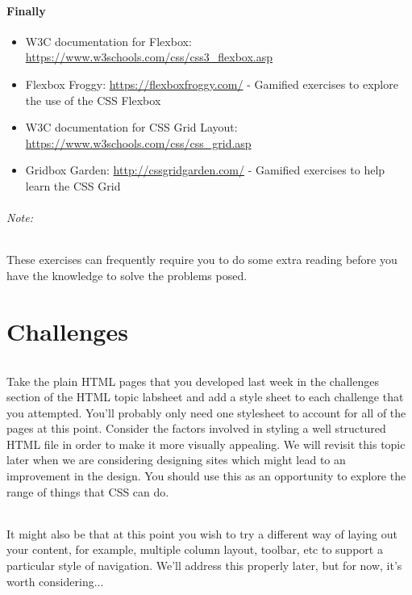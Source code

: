 \documentclass[10pt, a4paper, twosize]{article}
\begin{document}
\subsection*{Finally}
\begin{itemize}
\item W3C documentation for Flexbox: \url{https://www.w3schools.com/css/css3_flexbox.asp}
\item Flexbox Froggy: \url{https://flexboxfroggy.com/} - Gamified exercises to explore the use of the CSS Flexbox
\item W3C documentation for CSS Grid Layout: \url{https://www.w3schools.com/css/css_grid.asp}
\item Gridbox Garden: \url{http://cssgridgarden.com/} - Gamified exercises to help learn the CSS Grid
\end{itemize}

\paragraph{Note:} These exercises can frequently require you to do some extra reading before you have the knowledge to solve the problems posed.




\clearpage
\part{Challenges}
\paragraph{} Take the plain HTML pages that you developed last week in the challenges section of the HTML topic labsheet and add a style sheet to each challenge that you attempted. You'll probably only need one stylesheet to account for all of the pages at this point. Consider the factors involved in styling a well structured HTML file in order to make it more visually appealing.  We will revisit this topic later when we are considering designing sites which might lead to an improvement in the design. You should use this as an opportunity to explore the range of things that CSS can do.

\paragraph{} It might also be that at this point you wish to try a different way of laying out your content, for example, multiple column layout, toolbar, etc to support a particular style of navigation. We'll address this properly later, but for now, it's worth considering...
\end{document}
